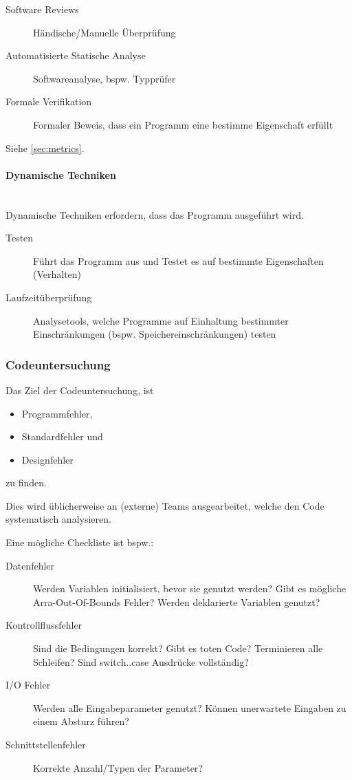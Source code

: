 \documentclass[ngerman]{tuda_summary}
\begin{document}
\begin{description}
    \item[Software Reviews] Händische/Manuelle Überprüfung
    \item[Automatisierte Statische Analyse] Softwareanalyse, bspw. Typprüfer
    \item[Formale Verifikation] Formaler Beweis, dass ein Programm eine bestimme Eigenschaft erfüllt
\end{description}

Siehe \ref{sec:metrics}.

\paragraph{Dynamische Techniken}\mbox{}\\
Dynamische Techniken erfordern, dass das Programm ausgeführt wird.

\begin{description}
    \item[Testen] Führt das Programm aus und Testet es auf bestimmte Eigenschaften (Verhalten)
    \item[Laufzeitüberprüfung] Analysetools, welche Programme auf Einhaltung bestimmter Einschränkungen (bspw. Speichereinschränkungen) testen
\end{description}

\subsubsection{Codeuntersuchung}
Das Ziel der Codeuntersuchung, ist
\begin{itemize}
    \item Programmfehler,
    \item Standardfehler und
    \item Designfehler
\end{itemize}
zu finden.

Dies wird üblicherweise an (externe) Teams ausgearbeitet, welche den Code systematisch analysieren.

Eine mögliche Checkliste ist bspw.:
\begin{description}
    \item[Datenfehler] Werden Variablen initialisiert, bevor sie genutzt werden? Gibt es mögliche Arra-Out-Of-Bounds Fehler? Werden deklarierte Variablen genutzt?
    \item[Kontrollflussfehler] Sind die Bedingungen korrekt? Gibt es toten Code? Terminieren alle Schleifen? Sind switch..case Ausdrücke vollständig?
    \item[I/O Fehler] Werden alle Eingabeparameter genutzt? Können unerwartete Eingaben zu einem Absturz führen?
    \item[Schnittstellenfehler] Korrekte Anzahl/Typen der Parameter?
\end{description}
\end{document}
